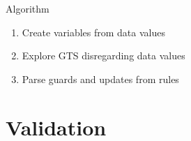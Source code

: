 \documentclass{FMTslides}
\begin{document}
\begin{frame}{Algorithm}
\begin{enumerate}
\item Create variables from data values
\item Explore GTS disregarding data values
\item Parse guards and updates from rules
\end{enumerate}
\begin{figure}
\centering
    \hspace{10px}
    \hspace{10px}
\end{figure}
\end{frame}


\section[Validation]{Validation}
\end{document}
